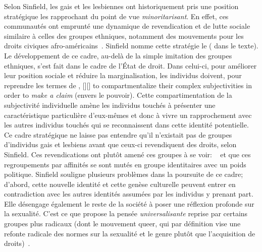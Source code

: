 Selon Sinfield, les gais et les lesbiennes ont historiquement pris une position stratégique les rapprochant du point de vue \emph{minoritarisant}.
En effet, ces communautés ont emprunté une dynamique de revendication et de lutte sociale similaire à celles des groupes ethniques, notamment des mouvements pour les droits civiques afro-américains~\citep[271]{Sinfield1996}. 
Sinfield nomme cette stratégie le  ( dans le texte). 
Le développement de ce cadre, au-delà de la simple imitation des groupes ethniques, s'est fait dans le cadre de l'État de droit. 
Dans celui-ci, pour améliorer leur position sociale et réduire la marginalisation, les individus doivent, pour reprendre les termes de \citet{Sinfield1996}, [{\citeyear[272]{Sinfield1996}}][]{\textelp{} to   compartmentalize their complex subjectivities in order to \emph{make a claim} (envers le pouvoir)}.
Cette compartimentation de la subjectivité individuelle amène les individus touchés à présenter une caractéristique particulière d'eux-mêmes et donc à vivre un rapprochement avec les autres individus touchés qui se reconnaissent dans cette identité potentielle. 
Ce cadre stratégique ne laisse pas entendre qu'il n'existait pas de groupes d'individus gais et lesbiens avant que ceux-ci revendiquent des droits, selon Sinfield. 
Ces revendications ont plutôt amené ces groupes à se voir:  ~\citep[272]{Sinfield1996} et que ces regroupements par affinités se sont mutés en groupe identitaires avec un poids politique. 
Sinfield souligne plusieurs problèmes dans la poursuite de ce cadre; d'abord, cette nouvelle identité et cette genèse culturelle peuvent entrer en contradiction avec les autres identités assumées par les individus y prenant part. 
Elle désengage également le reste de la société à poser une réflexion profonde sur la sexualité. 
C'est ce que propose la pensée \emph{universalisante} reprise par certains groupes plus radicaux (dont le mouvement queer, qui par définition vise une refonte radicale des normes sur la sexualité et le genre plutôt que l'acquisition de droits)~\citep[273]{Sinfield1996}.

